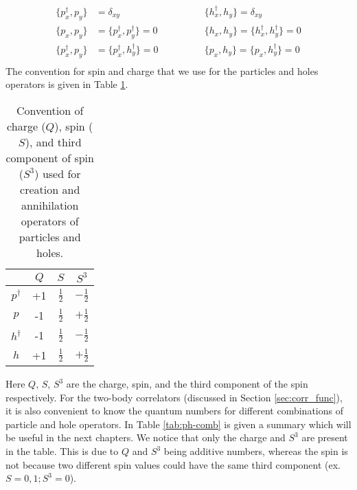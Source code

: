 \begin{equation}
    \begin{aligned}
        \{ p^\dagger_x, p_y \} &= \delta_{xy} &\{ h^\dagger_x, h_y \} = \delta_{xy}
        \\
        \{ p_x, p_y \} &= \{ p^\dagger_x, p^\dagger_y \} = 0 &\{ h_x, h_y \} = \{ h^\dagger_x, h^\dagger_y \} = 0
        \\
        \{ p^\dagger_x, p_y \} &= \{ p^\dagger_x, h^\dagger_y \} = 0 \qquad\qquad &\{ p_x, h_y \} = \{ p_x, h^\dagger_y \} = 0
        \\
    \end{aligned}
\end{equation}
The convention for spin and charge that we use for the particles and holes operators is given in Table \ref{tab:convention_operators}.
\begin{table}[h]
    \centering
    \begin{tabular}{c|ccc}
        & $Q$ & $S$ & $S^3$ \\
    \hline
        $p^\dagger$ & +1 & $\frac{1}{2}$ & $-\frac{1}{2}$ \\
        $p$ & -1 & $\frac{1}{2}$ & $+\frac{1}{2}$ \\
        $h^\dagger$ & -1 & $\frac{1}{2}$ & $-\frac{1}{2}$ \\
        $h$ & +1 & $\frac{1}{2}$ & $+\frac{1}{2}$ \\
    \end{tabular}
    \caption{Convention of charge ($Q$), spin ($S$), and third component of spin ($S^3$) used for creation and annihilation operators of particles and holes.}
    \label{tab:convention_operators}
\end{table}
Here $Q$, $S$, $S^3$ are the charge, spin, and the third component of the spin respectively. For the two-body correlators (discussed in Section \ref{sec:corr_func}), it is also convenient to know the quantum numbers for different combinations of particle and hole operators. In Table \ref{tab:ph-comb} is given a summary which will be useful in the next chapters. We notice that only the charge and $S^3$ are present in the table. This is due to $Q$ and $S^3$ being additive numbers, whereas the spin is not because two different spin values could have the same third component (ex. $S=0,1;S^3=0$).
